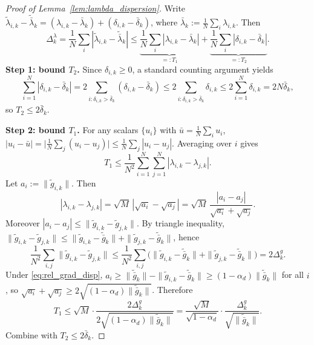 \documentclass[review,onefignum,onetabnum]{siamart171218}
\begin{document}
	\begin{proof}[Proof of Lemma~\ref{lem:lambda_dispersion}]
		Write $\tilde\lambda_{i,k}-\tilde{\bar\lambda}_k=(\lambda_{i,k}-\bar\lambda_k)+(\delta_{i,k}-\bar\delta_k)$,
		where $\bar\lambda_k:=\frac1N\sum_i\lambda_{i,k}$.
		Then
		\[
		\Delta_k^\lambda
		=\frac1N\sum_i|\tilde\lambda_{i,k}-\tilde{\bar\lambda}_k|
		\le \underbrace{\frac1N\sum_i|\lambda_{i,k}-\bar\lambda_k|}_{=:T_1}
		+\underbrace{\frac1N\sum_i|\delta_{i,k}-\bar\delta_k|}_{=:T_2}.
		\]
		\textbf{Step 1: bound $T_2$.}
		Since $\delta_{i,k}\ge0$, a standard counting argument yields
		\[
		\sum_{i=1}^N|\delta_{i,k}-\bar\delta_k|
		=2\sum_{i:\delta_{i,k}>\bar\delta_k}(\delta_{i,k}-\bar\delta_k)
		\le 2\sum_{i:\delta_{i,k}>\bar\delta_k}\delta_{i,k}
		\le 2\sum_{i=1}^N\delta_{i,k}=2N\bar\delta_k,
		\]
		so $T_2\le 2\bar\delta_k$.
		
		\textbf{Step 2: bound $T_1$.}
		For any scalars $\{u_i\}$ with $\bar u=\frac1N\sum_i u_i$,
		$|u_i-\bar u|=\big|\frac1N\sum_j(u_i-u_j)\big|\le \frac1N\sum_j|u_i-u_j|$.
		Averaging over $i$ gives
		\[
		T_1\le \frac{1}{N^2}\sum_{i=1}^N\sum_{j=1}^N|\lambda_{i,k}-\lambda_{j,k}|.
		\]
		Let $a_i:=\|\tilde g_{i,k}\|$. Then
		\[
		|\lambda_{i,k}-\lambda_{j,k}|
		=\sqrt{M}\,|\sqrt{a_i}-\sqrt{a_j}|
		=\sqrt{M}\,\frac{|a_i-a_j|}{\sqrt{a_i}+\sqrt{a_j}}.
		\]
		Moreover $|a_i-a_j|\le \|\tilde g_{i,k}-\tilde g_{j,k}\|$.
		By triangle inequality,
		$\|\tilde g_{i,k}-\tilde g_{j,k}\|\le \|\tilde g_{i,k}-\tilde{\bar g}_k\|+\|\tilde g_{j,k}-\tilde{\bar g}_k\|$,
		hence
		\[
		\frac1{N^2}\sum_{i,j}\|\tilde g_{i,k}-\tilde g_{j,k}\|
		\le \frac1{N^2}\sum_{i,j}\big(\|\tilde g_{i,k}-\tilde{\bar g}_k\|+\|\tilde g_{j,k}-\tilde{\bar g}_k\|\big)
		=2\Delta_k^g.
		\]
		Under \eqref{eq:rel_grad_disp}, $a_i\ge \|\tilde{\bar g}_k\|-\|\tilde g_{i,k}-\tilde{\bar g}_k\|\ge (1-\alpha_d)\|\tilde{\bar g}_k\|$ for all $i$,
		so $\sqrt{a_i}+\sqrt{a_j}\ge 2\sqrt{(1-\alpha_d)\|\tilde{\bar g}_k\|}$.
		Therefore
		\[
		T_1\le \sqrt{M}\cdot \frac{2\Delta_k^g}{2\sqrt{(1-\alpha_d)\|\tilde{\bar g}_k\|}}
		=\frac{\sqrt{M}}{\sqrt{1-\alpha_d}}\cdot \frac{\Delta_k^g}{\sqrt{\|\tilde{\bar g}_k\|}}.
		\]
		Combine with $T_2\le 2\bar\delta_k$.
	\end{proof}
	
\end{document}
